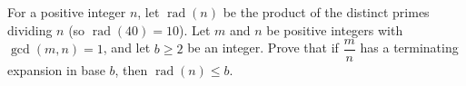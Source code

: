 For a positive integer $n$, let $\operatorname{rad}(n)$ be the product of the distinct primes dividing $n$ (so $\operatorname{rad}(40)=10$). Let $m$ and $n$ be positive integers with $\gcd(m,n)=1$, and let $b\ge2$ be an integer. Prove that if $\dfrac {m}{n}$ has a terminating expansion in base $b$, then $\operatorname{rad}(n)\le b$.

